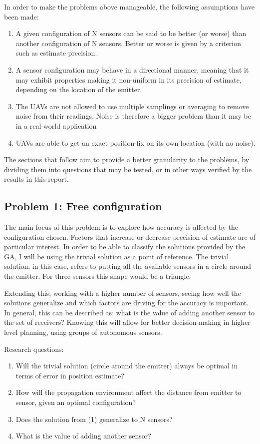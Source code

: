 \documentclass[10pt,a4paper]{book}
\begin{document}
In order to make the problems above manageable, the following assumptions have been made:
\begin{enumerate}
\item A given configuration of N sensors can be said to be better (or worse) than another configuration of N sensors. Better or worse is given by a criterion such as estimate precision.
\item A sensor configuration may behave in a directional manner, meaning that it may exhibit properties making it non-uniform in its precision of estimate, depending on the location of the emitter.
\item The \glspl{UAV} are not allowed to use multiple samplings or averaging to remove noise from their readings. Noise is therefore a bigger problem than it may be in a real-world application
\item \glspl{UAV} are able to get an exact position-fix on its own location (with no noise).
\end{enumerate}

The sections that follow aim to provide a better granularity to the problems, by dividing them into questions that may be tested, or in other ways verified by the results in this report. 





\subsection{Problem 1: Free configuration}
\label{P1FC}
The main focus of this problem is to explore how accuracy is affected by the configuration chosen. Factors that increase or decrease precision of estimate are of particular interest. In order to be able to classify the solutions provided by the \gls{GA}, I will be using the trivial solution as a point of reference. The trivial solution, in this case, refers to putting all the available sensors in a circle around the emitter. For three sensors this shape would be a triangle.

Extending this, working with a higher number of sensors, seeing how well the solutions generalize and which factors are driving for the accuracy is important. In general, this can be described as: what is the value of adding another sensor to the set of receivers? Knowing this will allow for better decision-making in higher level planning, using groups of autonomous sensors.

Research questions:
\begin{enumerate}
\item Will the trivial solution (circle around the emitter) always be optimal in terms of error in position estimate?
\item How will the propagation environment affect the distance from emitter to sensor, given an optimal configuration?
\item Does the solution from (1) generalize to N sensors?
\item What is the value of adding another sensor?
\end{enumerate}
\end{document}
